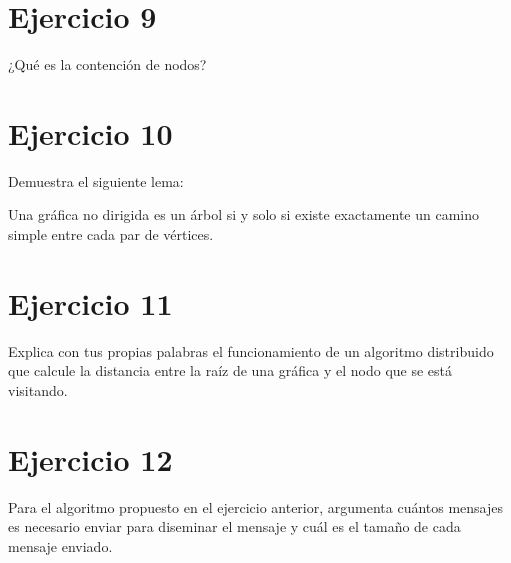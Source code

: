 \documentclass{article}
\begin{document}
\section*{Ejercicio 9}
¿Qué es la contención de nodos?

\section*{Ejercicio 10}
Demuestra el siguiente lema:

\begin{lemma}
Una gráfica no dirigida es un árbol si y solo si existe exactamente un camino simple entre cada par de vértices.
\end{lemma}

\section*{Ejercicio 11}
Explica con tus propias palabras el funcionamiento de un algoritmo distribuido que calcule la distancia entre la raíz de una gráfica y el nodo que se está visitando.

\section*{Ejercicio 12}
Para el algoritmo propuesto en el ejercicio anterior, argumenta cuántos mensajes es necesario enviar para diseminar el mensaje y cuál es el tamaño de cada mensaje enviado.
\end{document}
